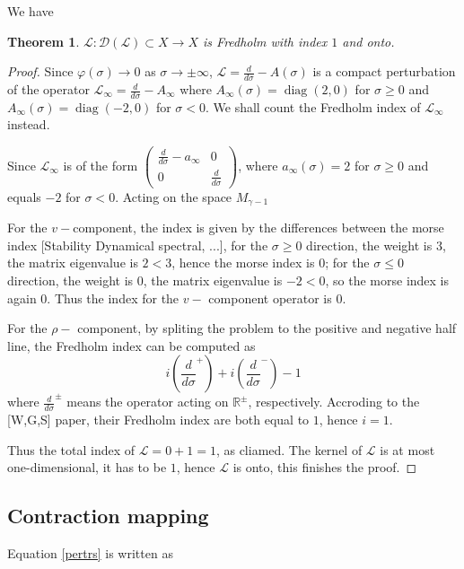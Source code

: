 \documentclass[letterpaper,11pt]{article}
\newcommand{\R}{\mathbb{R}}
\newcommand{\diag}{\operatorname{diag}}
\numberwithin{equation}{section}
\theoremstyle{plain}
\newtheorem{theorem}{Theorem}[section]
\begin{document}
We have
\begin{theorem}
$\mathcal{L} : \mathcal{D}(\mathcal{L}) \subset X \to X$ is Fredholm with index $1 $ and onto.
\end{theorem}
\begin{proof}
Since $\varphi(\sigma) \to 0$ as $\sigma \to \pm\infty$, $\mathcal{L} = \frac{d}{d\sigma} - A(\sigma)$ is a compact perturbation of the operator $\mathcal{L}_\infty = \frac{d}{d\sigma}-A_\infty$ where $A_\infty (\sigma) = \diag(2,0)$ for $\sigma \ge 0$ and $A_\infty(\sigma)  = \diag(-2,0)$ for $\sigma < 0$. We shall count the Fredholm index of $\mathcal{L}_\infty$ instead.

Since $\mathcal{L}_\infty$ is of the form
$\begin{pmatrix}
\frac{d}{d\sigma} - a_\infty& 0 \\
0&\frac{d}{d\sigma}
\end{pmatrix}$, where $a_\infty(\sigma) = 2$ for $\sigma \ge 0$ and equals $-2$ for $\sigma < 0$. Acting on the space $M_{\gamma-1}$


For the $v-$component, the index is given by the differences between the morse index [Stability Dynamical spectral, ...], for the $\sigma\ge 0$ direction, the weight is $3$, the matrix eigenvalue is $2<3$, hence the morse index is $0$; for the $\sigma \le 0$ direction, the weight is $0$, the matrix eigenvalue is $-2<0$, so the morse index is again $0$. Thus the index for the $v-$ component operator is $0$.

For the $\rho-$ component, by spliting the problem to the positive and negative half line, the Fredholm index can be computed as
\[
i\left(\frac{d}{d\sigma}^+\right)+i\left(\frac{d}{d\sigma}^-\right) - 1
\]
where $\frac{d}{d\sigma}^{\pm}$ means the operator acting on $\R^{\pm}$, respectively. Accroding to the [W,G,S] paper, their Fredholm index are both equal to $1$, hence $i=1$.

Thus the total index of $\mathcal{L} =0+1= 1$, as cliamed. The kernel of $\mathcal{L}$ is at most one-dimensional, it has to be $1$, hence $\mathcal{L}$ is onto, this finishes the proof.
\end{proof}





\subsection{Contraction mapping}
Equation \eqref{pertrs} is written as
\end{document}
